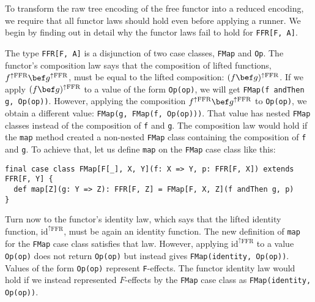 To transform the raw tree encoding of the free functor into a reduced
encoding, we require that all functor laws should hold even before
applying a runner. We begin by finding out in detail why the functor
laws fail to hold for \lstinline!FFR[F, A]!.

The type \lstinline!FFR[F, A]!
is a disjunction of two case classes, \lstinline!FMap!
and \lstinline!Op!. The
functor\textsf{'}s composition law says that the composition of lifted functions,
$f^{\uparrow\text{FFR}}\bef g^{\uparrow\text{FFR}}$, must be equal
to the lifted composition: $(f\bef g)^{\uparrow\text{FFR}}$. If we
apply $(f\bef g)^{\uparrow\text{FFR}}$ to a value of the form \lstinline!Op(op)!,
we will get \lstinline!FMap(f andThen g, Op(op))!.
However, applying the composition $f^{\uparrow\text{FFR}}\bef g^{\uparrow\text{FFR}}$
to \lstinline!Op(op)!,
we obtain a different value: \lstinline!FMap(g, FMap(f, Op(op)))!.
That value has nested \lstinline!FMap!
classes instead of the composition of \lstinline!f!
and \lstinline!g!. The
composition law would hold if the \lstinline!map!
method created a non-nested \lstinline!FMap!
class containing the composition of \lstinline!f!
and \lstinline!g!. To achieve
that, let us define \lstinline!map!
on the \lstinline!FMap!
case class like this:
\begin{lstlisting}
final case class FMap[F[_], X, Y](f: X => Y, p: FFR[F, X]) extends FFR[F, Y] {
  def map[Z](g: Y => Z): FFR[F, Z] = FMap[F, X, Z](f andThen g, p)
}
\end{lstlisting}
Turn now to the functor\textsf{'}s identity law, which says that the lifted
identity function, $\text{id}^{\uparrow\text{FFR}}$, must be again
an identity function. The new definition of \lstinline!map!
for the \lstinline!FMap!
case class satisfies that law. However, applying $\text{id}^{\uparrow\text{FFR}}$
to a value \lstinline!Op(op)!
does not return \lstinline!Op(op)!
but instead gives \lstinline!FMap(identity, Op(op))!.
Values of the form \lstinline!Op(op)!
represent \lstinline!F!-effects.
The functor identity law would hold if we instead represented $F$-effects
by the \lstinline!FMap!
case class as \lstinline!FMap(identity, Op(op))!.

